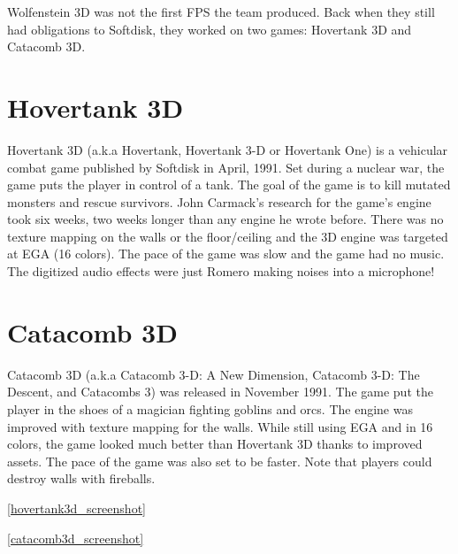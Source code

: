 Wolfenstein 3D was not the first FPS the team produced. Back when they still had obligations to Softdisk, they worked on two games: Hovertank 3D and Catacomb 3D.\\
\par
\section{Hovertank 3D}
Hovertank 3D (a.k.a Hovertank, Hovertank 3-D or Hovertank One) is a vehicular combat game published by Softdisk in April, 1991. Set during a nuclear war, the game puts the player in control of a tank. The goal of the game is to kill mutated monsters and rescue survivors. John Carmack's research for the game's engine took six weeks, two weeks longer than any engine he wrote before. There was no texture mapping on the walls or the floor/ceiling and the 3D engine was targeted at EGA (16 colors). The pace of the game was slow and the game had no music. The digitized audio effects were just Romero making noises into a microphone! \\
\par

\section{Catacomb 3D}
Catacomb 3D (a.k.a Catacomb 3-D: A New Dimension, Catacomb 3-D: The Descent, and Catacombs 3) was released in November 1991. The game put the player in the shoes of a magician fighting goblins and orcs. The engine was improved with texture mapping for the walls. While still using EGA and in 16 colors, the game looked much better than Hovertank 3D thanks to improved assets. The pace of the game was also set to be faster. Note that players could destroy walls with fireballs.\\
\par


\begin{minipage}{\textwidth}
\ref{hovertank3d_screenshot}
\begin{figure}[H]
\centering
{}
\end{figure}

\begin{figure}[H]
\centering
{}
\end{figure}
\end{minipage}


\begin{minipage}{\textwidth}
\ref{catacomb3d_screenshot}
\begin{figure}[H]
\centering
{}
\end{figure}

\begin{figure}[H]
\centering
{}
\end{figure}
\end{minipage}

